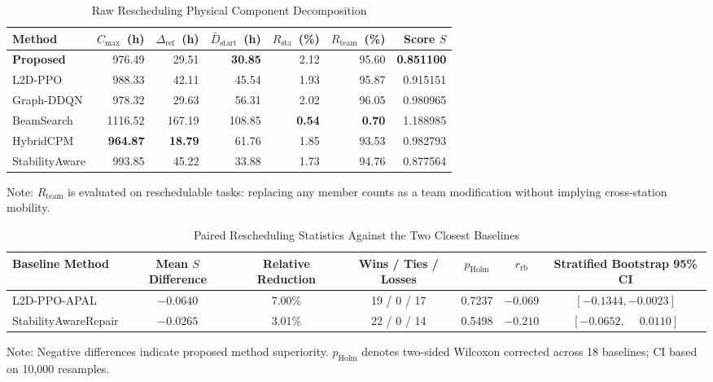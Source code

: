 \documentclass[journal,10pt]{IEEEtran}
\renewcommand{\arraystretch}{1.06}
\begin{document}
\begin{table}[!t]
\centering
\caption{Raw Rescheduling Physical Component Decomposition}
\label{tab:raw_components}
\setlength{\tabcolsep}{3pt}
\renewcommand{\arraystretch}{1.05}
\begin{adjustbox}{max width=\columnwidth}
\begin{tabular}{@{}lrrrrrr@{}}
\toprule
\textbf{Method} & $C_{\max}$~(h) & $\Delta_{\mathrm{ref}}$~(h) & $\bar D_{\mathrm{start}}$~(h) & $R_{\mathrm{sta}}$~(\%) & $R_{\mathrm{team}}$~(\%) & \textbf{Score} $S$ \\
\midrule
\textbf{Proposed} & 976.49 & 29.51 & \textbf{30.85} & 2.12 & 95.60 & \textbf{0.851100} \\
L2D-PPO & 988.33 & 42.11 & 45.54 & 1.93 & 95.87 & 0.915151 \\
Graph-DDQN & 978.32 & 29.63 & 56.31 & 2.02 & 96.05 & 0.980965 \\
BeamSearch & 1116.52 & 167.19 & 108.85 & \textbf{0.54} & \textbf{0.70} & 1.188985 \\
HybridCPM & \textbf{964.87} & \textbf{18.79} & 61.76 & 1.85 & 93.53 & 0.982793 \\
StabilityAware & 993.85 & 45.22 & 33.88 & 1.73 & 94.76 & 0.877564 \\
\bottomrule
\end{tabular}
\end{adjustbox}
\par\smallskip
{\footnotesize Note: $R_{\mathrm{team}}$ is evaluated on reschedulable tasks: replacing any member counts as a team modification without implying cross-station mobility.}
\end{table}

\begin{table}[!t]
\centering
\caption{Paired Rescheduling Statistics Against the Two Closest Baselines}
\label{tab:paired_stats}
\setlength{\tabcolsep}{8pt}
\renewcommand{\arraystretch}{1.06}
\begin{adjustbox}{max width=\textwidth}
\begin{tabular}{@{}lcccccc@{}}
\toprule
\textbf{Baseline Method} & \textbf{Mean $S$ Difference} & \textbf{Relative Reduction} & \textbf{Wins / Ties / Losses} & $p_{\mathrm{Holm}}$ & $r_{\mathrm{rb}}$ & \textbf{Stratified Bootstrap 95\% CI} \\
\midrule
L2D-PPO-APAL & $-0.0640$ & 7.00\% & 19 / 0 / 17 & 0.7237 & $-0.069$ & $[-0.1344, -0.0023]$ \\
StabilityAwareRepair & $-0.0265$ & 3.01\% & 22 / 0 / 14 & 0.5498 & $-0.210$ & $[-0.0652, \phantom{-}0.0110]$ \\
\bottomrule
\end{tabular}
\end{adjustbox}
\par\smallskip
{\footnotesize Note: Negative differences indicate proposed method superiority. $p_{\mathrm{Holm}}$ denotes two-sided Wilcoxon corrected across 18 baselines; CI based on 10,000 resamples.}
\end{table}
\end{document}
